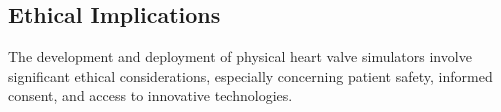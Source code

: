\subsection{Ethical Implications}
The development and deployment of physical heart valve simulators involve significant ethical considerations, especially concerning patient safety, informed consent, and access to innovative technologies.

